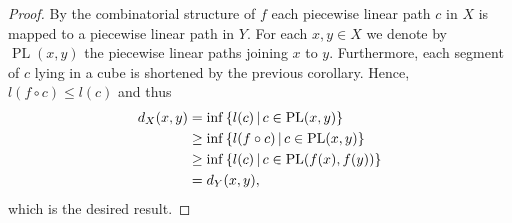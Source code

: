 \begin{proof}
  By the combinatorial structure of \(f\) each piecewise linear path \(c\) in \(X\) is mapped to a piecewise linear path in \(Y\). For each \(x,y \in X\) we denote by \(\operatorname{PL}(x,y)\) the piecewise linear paths joining \(x\) to \(y\). Furthermore, each segment of \(c\) lying in a cube is shortened by the previous corollary. Hence, \(l(f \circ c) \leq l(c)\) and thus
  \begin{align*}
    d_X(x,y)
    & = \inf\left\{l(c) \,\middle|\, c \in \operatorname{PL}(x,y)\right\}\\
    & \geq \inf\left\{l(f \circ c) \,\middle|\, c \in \operatorname{PL}(x,y)\right\}\\
    & \geq \inf\left\{l(c) \,\middle|\, c \in \operatorname{PL}(f(x), f(y))\right\}\\
    & = d_Y(x,y),
  \end{align*}
  which is the desired result.
\end{proof}



